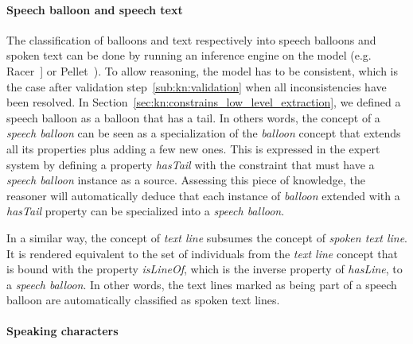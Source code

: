 

\paragraph{Speech balloon and speech text} %
\label{par:speech_balloon_and_speech_text}

The classification of balloons and text respectively into speech balloons and spoken text can be done by running an inference engine on the model (e.g. Racer~\cite{Haarslev2012}] or Pellet~\cite{Sirin2007a}).
To allow reasoning, the model has to be consistent, which is the case after validation step~\ref{sub:kn:validation} when all inconsistencies have been resolved.
In Section~\ref{sec:kn:constrains_low_level_extraction}, we defined a speech balloon as a balloon that has a tail.
In others words, the concept of a \textit{speech balloon} can be seen as a specialization of the \textit{balloon} concept that extends all its properties plus adding a few new ones.
This is expressed in the expert system by defining a property \textit{hasTail} with the constraint that must have a \textit{speech balloon} instance as a source.
Assessing this piece of knowledge, the reasoner will automatically deduce that each instance of \textit{balloon} extended with a \textit{hasTail} property can be specialized into a \textit{speech balloon}.

In a similar way, the concept of \textit{text line} subsumes the concept of \textit{spoken text line}.
It is rendered equivalent to the set of individuals from the \textit{text line} concept that is bound with the property \textit{isLineOf}, which is the inverse property of \textit{hasLine}, to a \textit{speech balloon}.
In other words, the text lines marked as being part of a speech balloon are automatically classified as spoken text lines.


\paragraph{Speaking characters} %
\label{sub:inference_of_the_speaking_characters}

